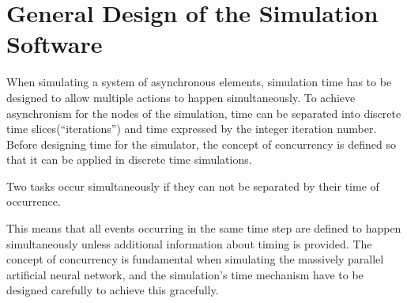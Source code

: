 	\section{General Design of the Simulation Software}
		When simulating a system of asynchronous elements, simulation time has to be designed to allow multiple actions to happen simultaneously. %
		To achieve asynchronism for the nodes of the simulation, time can be separated into discrete time slices(``iterations'') and time expressed by the integer iteration number.
		Before designing time for the simulator, the concept of concurrency is defined so that it can be applied in discrete time simulations.
	
		\begin{mydef}
			Two tasks occur simultaneously if they can not be separated by their time of occurrence. %
		\end{mydef}
		This means that all events occurring in the same time step are defined to happen simultaneously unless additional information about timing is provided.
		The concept of concurrency is fundamental when simulating the massively parallel artificial neural network, and the simulation's time mechanism have to be designed carefully to achieve this gracefully.

